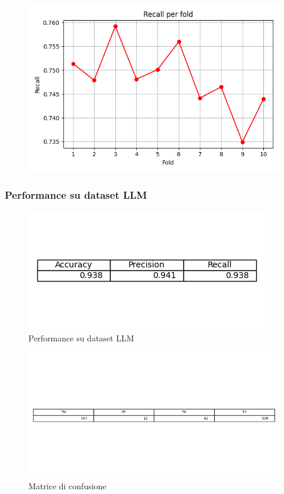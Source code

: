 \documentclass[12pt,a4paper]{report} %
\begin{document}
\begin{figure}[H]
    \centering
    \includegraphics[width=0.75\linewidth]{immagini_modeling/recall_nb.png}
    \label{fig:enter-label}
\end{figure}
\subsubsection{Performance su dataset LLM}
\begin{figure}[H]
    \centering
    \includegraphics[width=0.75\linewidth]{immagini_modeling/nb_llm.png}
    \caption{Performance su dataset LLM}
    \label{fig:enter-label}
\end{figure}
\begin{figure}[H]
    \centering
    \includegraphics[width=1\linewidth]{immagini_modeling/nb_matrice.png}
    \caption{Matrice di confusione}
    \label{fig:enter-label}
\end{figure}
\end{document}
